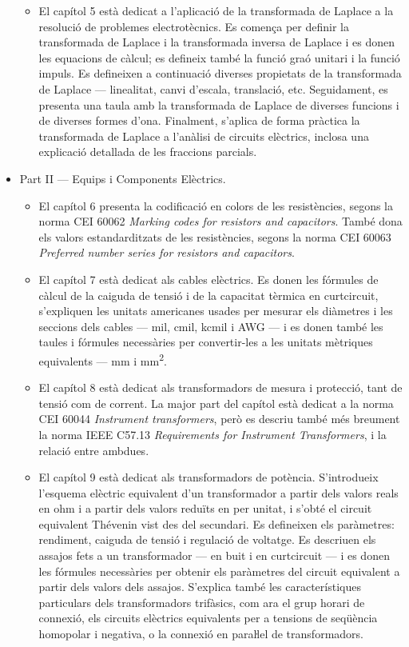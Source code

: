 \begin{itemize}
\begin{itemize}
			\item El capítol 5  està dedicat a l'aplicació de la transformada de Laplace a la resolució de problemes electrotècnics. Es comença per definir la transformada de Laplace i la transformada inversa de Laplace i es donen les equacions de càlcul; es defineix també la funció graó  unitari i la funció impuls. Es defineixen a continuació diverses propietats de la transformada de Laplace --- linealitat, canvi d'escala, translació, etc. Seguidament, es presenta una taula amb la transformada de Laplace de diverses funcions i de diverses formes d'ona. Finalment, s'aplica de forma pràctica la transformada de Laplace a l'anàlisi de circuits elèctrics, inclosa una explicació detallada de les fraccions parcials.
		\end{itemize}
		\item Part II --- Equips i Components Elèctrics. 
		\begin{itemize}
			\item El capítol 6 presenta  la codificació en colors de les resistències, segons la norma CEI 60062 \textit{Marking codes for resistors and capacitors}. També dona els valors estandarditzats de les resistències, segons la norma CEI 60063 \textit{Preferred number series for resistors and capacitors}.
			\item El capítol 7 està dedicat als cables elèctrics. Es donen les fórmules de càlcul de la caiguda de tensió i de la capacitat tèrmica en curtcircuit, s'expliquen  les unitats americanes usades per mesurar els diàmetres i les seccions dels cables --- mil, cmil, kcmil i AWG --- i es donen també les taules i fórmules necessàries per convertir-les a les  unitats mètriques equivalents --- mm i \unit{mm^2}.
			\item El capítol 8 està dedicat als transformadors de mesura i protecció, tant de tensió com de corrent. La major part del capítol està dedicat a la norma CEI 60044 \textit{Instrument transformers}, però es descriu també més breument  la norma IEEE C57.13 	\textit{	Requirements for Instrument Transformers}, i la relació entre ambdues.
			\item El capítol 9 està dedicat als transformadors de potència. S'introdueix l'esquema elèctric equivalent d'un transformador a partir dels valors reals en  ohm i a partir dels valors reduïts en per unitat, i s'obté el circuit equivalent Thévenin vist des del secundari. Es defineixen els paràmetres: rendiment,  caiguda de tensió i regulació de voltatge. Es descriuen els assajos fets a un transformador  --- en buit i en curtcircuit --- i es donen les fórmules necessàries per obtenir els paràmetres del circuit equivalent a partir dels valors dels assajos. S'explica també les característiques particulars dels transformadors trifàsics, com ara el grup horari de connexió,  els circuits elèctrics equivalents per a tensions de seqüència  homopolar i  negativa, o la connexió en paraŀlel de transformadors.

\end{itemize}
\end{itemize}
